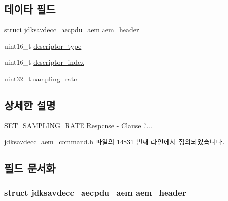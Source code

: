 \subsection*{데이타 필드}
\begin{DoxyCompactItemize}
\item 
struct \hyperlink{structjdksavdecc__aecpdu__aem}{jdksavdecc\+\_\+aecpdu\+\_\+aem} \hyperlink{structjdksavdecc__aem__command__set__sampling__rate__response_ae1e77ccb75ff5021ad923221eab38294}{aem\+\_\+header}
\item 
uint16\+\_\+t \hyperlink{structjdksavdecc__aem__command__set__sampling__rate__response_ab7c32b6c7131c13d4ea3b7ee2f09b78d}{descriptor\+\_\+type}
\item 
uint16\+\_\+t \hyperlink{structjdksavdecc__aem__command__set__sampling__rate__response_a042bbc76d835b82d27c1932431ee38d4}{descriptor\+\_\+index}
\item 
\hyperlink{parse_8c_a6eb1e68cc391dd753bc8ce896dbb8315}{uint32\+\_\+t} \hyperlink{structjdksavdecc__aem__command__set__sampling__rate__response_ab17c387eb7798bbb74ccfedd6f4cf21b}{sampling\+\_\+rate}
\end{DoxyCompactItemize}


\subsection{상세한 설명}
S\+E\+T\+\_\+\+S\+A\+M\+P\+L\+I\+N\+G\+\_\+\+R\+A\+TE Response -\/ Clause 7... 

jdksavdecc\+\_\+aem\+\_\+command.\+h 파일의 14831 번째 라인에서 정의되었습니다.



\subsection{필드 문서화}
\subsubsection[{\texorpdfstring{aem\+\_\+header}{aem_header}}]{\setlength{\rightskip}{0pt plus 5cm}struct {\bf jdksavdecc\+\_\+aecpdu\+\_\+aem} aem\+\_\+header}\hypertarget{structjdksavdecc__aem__command__set__sampling__rate__response_ae1e77ccb75ff5021ad923221eab38294}{}\label{structjdksavdecc__aem__command__set__sampling__rate__response_ae1e77ccb75ff5021ad923221eab38294}


